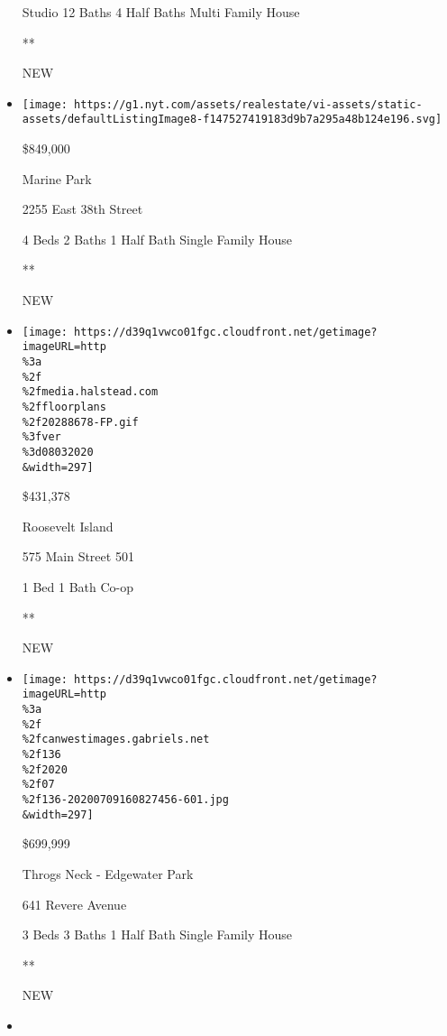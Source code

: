\begin{itemize}
  Studio \textbar{} 12 Baths \textbar{} 4 Half Baths \textbar{} Multi
  Family House

  **

  NEW
\item
  \href{/real-estate/usa/ny/brooklyn/marine-park/homes-for-sale/2255-east-38th-street/14888-5537978?}{}

  \texttt{[image: https://g1.nyt.com/assets/realestate/vi-assets/static-assets/defaultListingImage8-f147527419183d9b7a295a48b124e196.svg]}

  \$849,000

  Marine Park

  2255 East 38th Street

  4 Beds \textbar{} 2 Baths \textbar{} 1 Half Bath \textbar{} Single
  Family House

  **

  NEW
\item
  \href{/real-estate/usa/ny/new-york/roosevelt-island/homes-for-sale/575-main-street-501/185-20288678?}{}

  \texttt{[image: https://d39q1vwco01fgc.cloudfront.net/getimage?imageURL=http\\\%3a\\\%2f\\\%2fmedia.halstead.com\\\%2ffloorplans\\\%2f20288678-FP.gif\\\%3fver\\\%3d08032020\\\&width=297]}

  \$431,378

  Roosevelt Island

  575 Main Street 501

  1 Bed \textbar{} 1 Bath \textbar{} Co-op

  **

  NEW
\item
  \href{/real-estate/usa/ny/bronx/throgs-neck---edgewater-park/homes-for-sale/641-revere-avenue/11237-72170695289D4?}{}

  \texttt{[image: https://d39q1vwco01fgc.cloudfront.net/getimage?imageURL=http\\\%3a\\\%2f\\\%2fcanwestimages.gabriels.net\\\%2f136\\\%2f2020\\\%2f07\\\%2f136-20200709160827456-601.jpg\\\&width=297]}

  \$699,999

  Throgs Neck - Edgewater Park

  641 Revere Avenue

  3 Beds \textbar{} 3 Baths \textbar{} 1 Half Bath \textbar{} Single
  Family House

  **

  NEW
\item
  \href{/real-estate/usa/ny/new-york/hells-kitchen/homes-for-sale/450-west-55th-street/12436-OLRS-1891536?}{}


\end{itemize}
